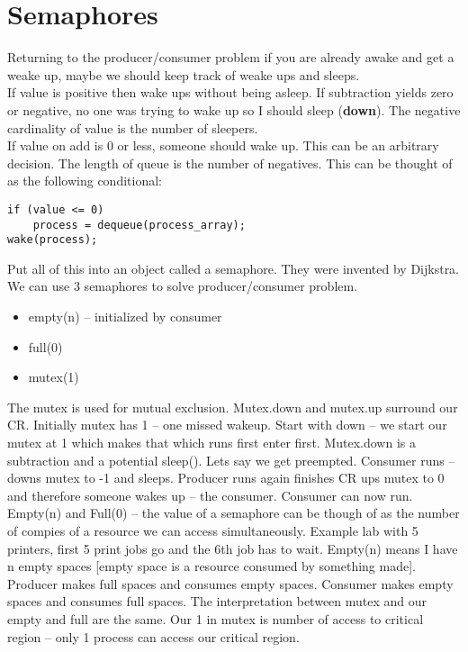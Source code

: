 \documentclass[../base_file/cs1550_notes.tex]{subfiles}
\begin{document}
\section{Semaphores}
Returning to the producer/consumer problem if you are already awake and get a weake up,
maybe we should keep track of weake ups and sleeps.\\
If value is positive then wake ups
without being asleep.  If subtraction yields zero or negative, no one was trying to
wake up so I should sleep (\textbf{down}).  The negative cardinality of value is
the number of sleepers.\\
If value on add is 0 or less, someone should wake up.  This can
be an arbitrary decision.  The length of queue is the number of negatives. This can be
thought of as the following conditional:
\begin{lstlisting}
if (value <= 0)
	process = dequeue(process_array);
wake(process);
\end{lstlisting}
Put all of this into an object called a semaphore.  They were invented by Dijkstra.\\
We can use 3 semaphores to solve producer/consumer problem.
\begin{itemize}
	\item empty(n) -- initialized by consumer
	\item full(0)
	\item mutex(1)
\end{itemize}

The mutex is used for mutual exclusion.  Mutex.down and mutex.up surround our CR.
Initially mutex has 1 -- one missed wakeup.  Start with down -- we start our mutex at 1
which makes that which runs first enter first.  Mutex.down is a subtraction and a potential
sleep().  Lets say we get preempted.  Consumer runs -- downs mutex to -1 and sleeps. Producer
runs again finishes CR ups mutex to 0 and therefore someone wakes up -- the consumer.  Consumer
can now run.\\

Empty(n) and Full(0) -- the value of a semaphore can be though of as the number of compies
of a resource we can access simultaneously.  Example lab with 5 printers, first 5 print jobs
go and the 6th job has to wait.  Empty(n) means I have n empty spaces [empty space is a resource
consumed by something made].  Producer makes full spaces and consumes empty spaces.  Consumer
makes empty spaces and consumes full spaces. The interpretation between mutex and our empty
and full are the same.  Our 1 in mutex is number of access to critical region -- only 1 process
can access our critical region.\\
\end{document}
